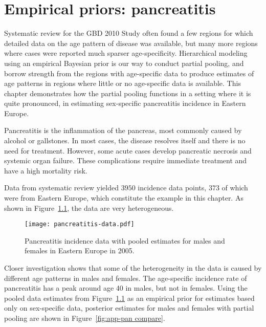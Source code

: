 \chapter{Empirical priors: pancreatitis}
\label{applications-priors_empirical}

Systematic review for the GBD 2010 Study often found a few regions for
which detailed data on the age pattern of disease was available, but
many more regions where cases were reported much sparser
age-specificity.  Hierarchical modeling using an empirical Bayesian
prior is our way to conduct partial pooling, and borrow strength from
the regions with age-specific data to produce estimates of age
patterns in regions where little or no age-specific data is available.
This chapter demonstrates how the partial pooling functions in a
setting where it is quite pronounced, in estimating sex-specific
pancreatitis incidence in Eastern Europe.

Pancreatitis is the inflammation of the pancreas, most commonly
caused by alcohol or gallstones.  In most cases, the disease resolves
itself and there is no need for treatment.  However, some acute
cases develop pancreatic necrosis and systemic organ failure.  These
complications require immediate treatment and have a high mortality risk.
\cite{raraty_acute_2004, banks_epidemiology_2002, sekimoto_JPN_2006}

Data from systematic review yielded $3950$ incidence data points,
$373$ of which were from Eastern Europe, which constitute the example
in this chapter.  As shown in Figure~\ref{fig:app-pan data}, the data
are very heterogeneous.

    \begin{figure}[h]
        \begin{center}
            \texttt{[image: pancreatitis-data.pdf]}
            \caption{Pancreatitis incidence data
              with pooled estimates for males and females in Eastern Europe in 2005.}
            \label{fig:app-pan data}
        \end{center}
    \end{figure}

Closer investigation shows that some of the heterogeneity in the data
is caused by different age patterns in males and females.  The
age-specific incidence rate of pancreatitis has a peak around age 40
in males, but not in females.  Using the pooled data estimates from
Figure~\ref{fig:app-pan data} as an empirical prior for estimates
based only on sex-specific data, posterior estimates for males and
females with partial pooling are shown in Figure~\ref{fig:app-pan
  compare}.

